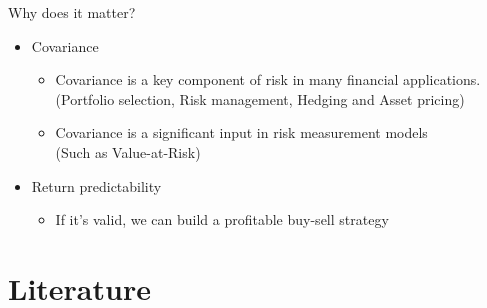 \documentclass{beamer}
\begin{document}
	\begin{frame}{Why does it matter?}
		\begin{itemize}
			\item Covariance
			\begin{itemize}
				\item Covariance is a key component of risk in
				many financial applications.
				\scriptsize(Portfolio selection, Risk management, Hedging and Asset
				pricing)
				\small
				\item Covariance is a significant input in risk measurement models \\ \scriptsize(Such as Value-at-Risk)\small
				
			\end{itemize}
			\item Return predictability
			\begin{itemize}
				\item If it's valid, we can build a profitable buy-sell strategy
			\end{itemize}
		\end{itemize}
		
	\end{frame}
	
	
	
	\section{Literature}
	

	

	
	
	
	
	\normalsize
	
\end{document}
